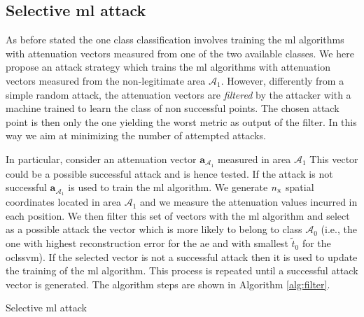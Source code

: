 \documentclass[draftcls,onecolumn,12pt]{IEEEtran}
\begin{document}
\subsection{Selective \ac{ml} attack}
As before stated the one class classification involves training the \ac{ml} algorithms with attenuation vectors measured from one of the two available classes. We here propose an attack strategy which trains the \ac{ml} algorithms with attenuation vectors measured from the non-legitimate area $\mathcal{A}_1$. However, differently from a simple random attack, the attenuation vectors are \emph{filtered} by the attacker with a machine trained to learn the class of non successful points. The chosen attack point is then only the one yielding the worst metric as output of the filter. In this way we aim at minimizing the number of attempted attacks.

In particular, consider an attenuation vector $\bm{a}_{\mathcal{A}_1}$ measured in area $\mathcal{A}_1$ This vector could be a possible successful attack and is hence tested. If the attack is not successful $\bm{a}_{\mathcal{A}_1}$ is used to train the \ac{ml} algorithm. 
We generate $n_{\rm x}$ spatial coordinates located in area $\mathcal{A}_1$ and we measure the attenuation values incurred in each position. We then filter this set of vectors with the \ac{ml} algorithm and select as a possible attack the vector which is more likely to belong to class $\mathcal{A}_0$ (i.e., the one with highest reconstruction error for the \ac{ae} and with smallest $\tilde{t}_0$ for the \ac{oclssvm}). If the selected vector is not a successful attack then it is used to update the training of the \ac{ml} algorithm. This process is repeated until a successful attack vector is generated. The algorithm steps are shown in Algorithm \ref{alg:filter}.

\begin{algorithm}[t]
\label{alg:filter}
  \scriptsize

 

    
 \caption{Selective \ac{ml} attack}
\end{algorithm}
\end{document}
